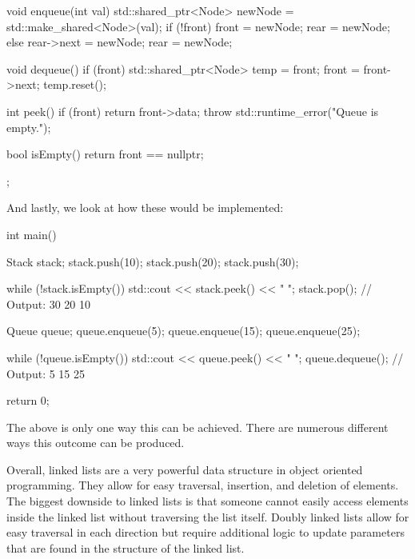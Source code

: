 \begin{highlight}
\begin{code}
{        void enqueue(int val) {
            std::shared_ptr<Node> newNode = std::make_shared<Node>(val);
            if (!front) {
                front = newNode;
                rear = newNode;
            } else {
                rear->next = newNode;
                rear = newNode;
            }
        }
    
        void dequeue() {
            if (front) {
                std::shared_ptr<Node> temp = front;
                front = front->next;
                temp.reset();
            }
        }
    
        int peek() {
            if (front) {
                return front->data;
            }
            throw std::runtime_error("Queue is empty.");
        }
    
        bool isEmpty() {
            return front == nullptr;
        }
    };        
\end{code}

And lastly, we look at how these would be implemented:

\begin{code}
int main() {
    Stack stack;
    stack.push(10);
    stack.push(20);
    stack.push(30);

    while (!stack.isEmpty()) {
        std::cout << stack.peek() << " ";
        stack.pop();
    }
    // Output: 30 20 10

    Queue queue;
    queue.enqueue(5);
    queue.enqueue(15);
    queue.enqueue(25);

    while (!queue.isEmpty()) {
        std::cout << queue.peek() << " ";
        queue.dequeue();
    }
    // Output: 5 15 25

    return 0;
}    
\end{code}

The above is only one way this can be achieved. There are numerous different ways this outcome can be produced.

\end{highlight}

Overall, linked lists are a very powerful data structure in object oriented programming. They allow for easy traversal, insertion, and deletion of elements. The biggest downside to linked lists is that
someone cannot easily access elements inside the linked list without traversing the list itself. Doubly linked lists allow for easy traversal in each direction but require additional logic to update
parameters that are found in the structure of the linked list.

\clearpage